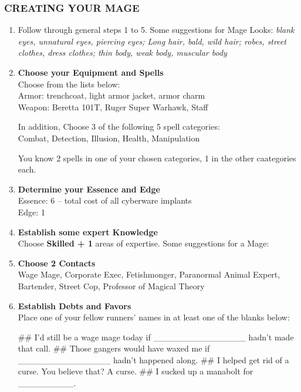 \subsubsection{CREATING YOUR MAGE}
\begin{enumerate}
    \item Follow through general steps 1 to 5. Some suggestions for Mage Looks: \textit{blank eyes, unnatural eyes, piercing eyes; Long hair, bald, wild hair; robes, street clothes, dress clothes; thin body, weak body, muscular body}
    
    \item \textbf{Choose your Equipment and Spells} \\
    Choose from the lists below: \\
    Armor: trenchcoat, light armor jacket, armor charm \\
    Weapon: Beretta 101T, Ruger Super Warhawk, Staff
    
    In addition, Choose 3 of the following 5 spell categories: \\
    Combat, Detection, Illusion, Health, Manipulation
    
    You know 2 spells in one of your chosen categories, 1 in the other caategories each.
    
    \item \textbf{Determine your Essence and Edge} \\
    Essence: 6 – total cost of all cyberware implants \\
    Edge: 1

    \item \textbf{Establish some expert Knowledge} \\
    Choose \textbf{\textsf{Skilled + 1}} areas of expertise. Some suggestions for a Mage: \textit{}
    
    \item \textbf{Choose 2 Contacts} \\
    Wage Mage, Corporate Exec, Fetishmonger, Paranormal Animal Expert, Bartender, Street Cop, Professor of Magical Theory
    
    \item \textbf{Establish Debts and Favors} \\
    Place one of your fellow runners’ names in at least one of the blanks below:
        \begin{easylist}
            ## I’d still be a wage mage today if \_\_\_\_\_\_\_\_\_\_\_\_\_\_\_ hadn’t made that call.
            ## Those gangers would have waxed me if \_\_\_\_\_\_\_\_\_\_\_\_\_\_\_ hadn’t happened along.
            ## I helped get rid of a curse. You believe that? A curse.
            ## I sucked up a manabolt for \_\_\_\_\_\_\_\_\_.
        \end{easylist}
    

\end{enumerate}
